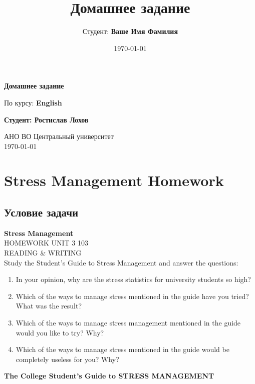 \documentclass[a4paper,12pt]{article}
\title{Домашнее задание}
\author{Студент: \textbf{Ваше Имя Фамилия}}
\date{\today}
\begin{document}
\begin{titlepage}
    \centering
    \vspace*{1cm}

    \Huge
    \textbf{Домашнее задание}

    \vspace{0.5cm}
    \LARGE
    По курсу: \textbf{English}

    \vspace{1.5cm}

    \textbf{Студент: Ростислав Лохов}

    \vfill

    \Large
    АНО ВО Центральный университет\\
    \vspace{0.3cm}
    \today

\end{titlepage}

\tableofcontents
\newpage

\section{Stress Management Homework}

\subsection{Условие задачи}

\textbf{Stress Management}\\
HOMEWORK UNIT 3 103\\
READING \& WRITING\\
Study the Student’s Guide to Stress Management and answer the questions:

\begin{enumerate}
    \item In your opinion, why are the stress statistics for university students so high?
    \item Which of the ways to manage stress mentioned in the guide have you tried? What was the result?
    \item Which of the ways to manage stress management mentioned in the guide would you like to try? Why?
    \item Which of the ways to manage stress mentioned in the guide would be completely useless for you? Why?
\end{enumerate}

\textbf{The College Student's Guide to STRESS MANAGEMENT}
\end{document}
